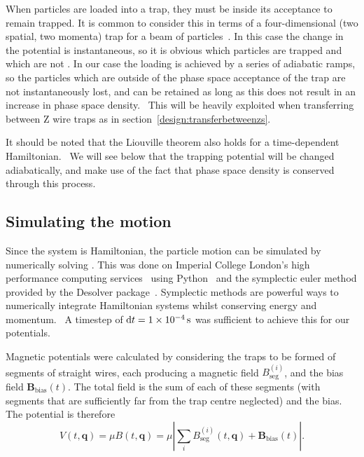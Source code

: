 \begin{figure}[tbh]
\centering
  \caption{}
  \label{design:fig:acceptance}
\end{figure}

When particles are loaded into a trap, they must be inside its acceptance to
remain trapped. It is common to consider this in terms of a four-dimensional
(two spatial, two momenta) trap for a beam of particles~\cite{}. In this case
the change in the potential is instantaneous, so it is obvious which particles
are trapped and which are not . In our case the loading is achieved by a series of adiabatic ramps,
so the particles which are outside of the phase space acceptance of the trap
are not instantaneously lost, and can be retained as long as this does not
result in an increase in phase space density.~\cite{}  This will be heavily exploited when transferring between Z wire
traps as in section~\ref{design:transferbetweenzs}.

It should be noted that the Liouville theorem also holds for a time-dependent
Hamiltonian.~\cite{} We will see below that the trapping potential will be changed
adiabatically, and make use of the fact that phase space density is conserved
through this process.

\subsection{Simulating the motion}
\label{design:motion:simmethods}


Since the system is Hamiltonian, the particle motion can be simulated by
numerically solving . This was done on Imperial
College London's high performance computing services~\cite{ICRCS} using
Python~\cite{} and the symplectic euler method provided by the Desolver
package~\cite{}. Symplectic methods are powerful ways to numerically integrate
Hamiltonian systems whilst conserving energy and momentum.~\cite{} A timestep of $\dd t
= \SI{1E-4}{\second}$ was sufficient to achieve this for our potentials.

Magnetic potentials were calculated by considering the traps to be formed of
segments of straight wires, each producing a magnetic field
$B_\text{seg}^{(i)}$, and the bias field $\mathbf{B}_\text{bias}(t)$. The total
field is the sum of each of these segments (with segments that are sufficiently
far from the trap centre neglected) and the bias. The potential is therefore
%
\begin{equation} V(t, \mathbf{q}) = \mu B (t, \mathbf{q}) = \mu \left| \sum_i
B_\text{seg}^{(i)}(t, \mathbf{q}) + \mathbf{B}_\text{bias}(t)\right|.
\end{equation}

